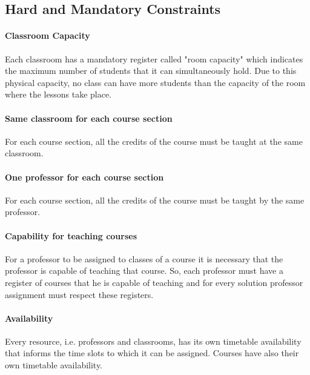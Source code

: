 \subsection{Hard and Mandatory Constraints}
\label{sec:mandatory}


\paragraph{Classroom Capacity}
\label{constrroomcap}

Each classroom has a mandatory register called "room capacity" which indicates the maximum number of students that it can simultaneously hold. Due to this physical capacity, no class can have more students than the capacity of the room where the lessons take place.


\paragraph{Same classroom for each course section}
\label{constroneroom}

For each course section, all the credits of the course must be taught at the same classroom.


\paragraph{One professor for each course section}
\label{constroneprof}

For each course section, all the credits of the course must be taught by the same professor.


\paragraph{Capability for teaching courses}
\label{constrcapab}

For a professor to be assigned to classes of a course it is necessary that the professor is capable of teaching that course. So, each professor must have a register of courses that he is capable of teaching and for every solution professor assignment must respect these registers.


\paragraph{Availability}
\label{constravailab}

Every resource, i.e. professors and classrooms, has its own timetable availability that informs the time slots to which it can be assigned. Courses have also their own timetable availability.

